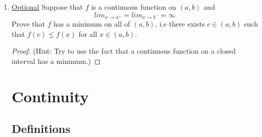 \documentclass{article} %
\theoremstyle{plain}
\theoremstyle{definition}
\theoremstyle{case}
\begin{document}
\begin{enumerate}[label={\fbox{\textbf{Exercise \#\arabic* :}}}]
\newpage

\item \underline{Optional} Suppose that $f$ is a continuous function on $(a,b)$ and 
  \[lim _{x\rightarrow a^{+}}= lim_{x\rightarrow b^{-}}=\infty \]
  Prove that $f$ has a minimum on all of $(a,b)$, i.e there exists
 $c \in (a,b)$ such that $f(c) \leq f(x)$ for all $x\in (a,b)$.

\begin{proof} (Hint: Try to use the fact that a continuous function on a
  closed interval has a minimum.)

\end{proof}

\newpage


\section*{Continuity}%

\subsection*{Definitions}


\end{enumerate}
\end{document}
